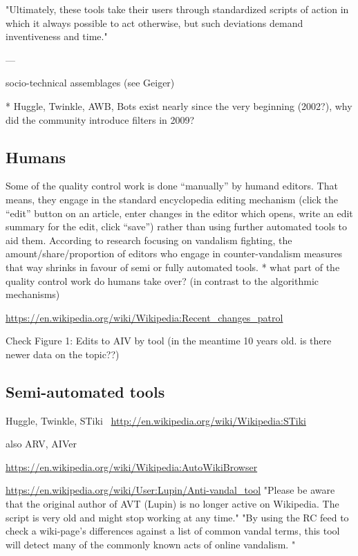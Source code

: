 "Ultimately, these tools take their users
through standardized scripts of action in which it always
possible to act otherwise, but such deviations demand
inventiveness and time."

---

socio-technical assemblages (see Geiger)

* Huggle, Twinkle, AWB, Bots exist nearly since the very beginning (2002?), why did the community introduce filters in 2009?

\subsection{Humans}

Some of the quality control work is done ``manually'' by humand editors.
That means, they engage in the standard encyclopedia editing mechanism (click the ``edit'' button on an article, enter changes in the editor which opens, write an edit summary for the edit, click ``save'') rather than using further automated tools to aid them.
According to research focusing on vandalism fighting, the amount/share/proportion of editors who engage in counter-vandalism measures that way shrinks in favour of semi or fully automated tools. %
* what part of the quality control work do humans take over? (in contrast to the algorithmic mechanisms)

\url{https://en.wikipedia.org/wiki/Wikipedia:Recent_changes_patrol}

\cite{GeiRib2010}
Check Figure 1: Edits to AIV by tool (in the meantime 10 years old. is there newer data on the topic??)

\subsection{Semi-automated tools}


Huggle, Twinkle, STiki~\cite{WestKanLee2010}
\url{http://en.wikipedia.org/wiki/Wikipedia:STiki}

also ARV, AIVer

\url{https://en.wikipedia.org/wiki/Wikipedia:AutoWikiBrowser}

\url{https://en.wikipedia.org/wiki/User:Lupin/Anti-vandal_tool}
"Please be aware that the original author of AVT (Lupin) is no longer active on Wikipedia. The script is very old and might stop working at any time."
"By using the RC feed to check a wiki-page's differences against a list of common vandal terms, this tool will detect many of the commonly known acts of online vandalism. "

